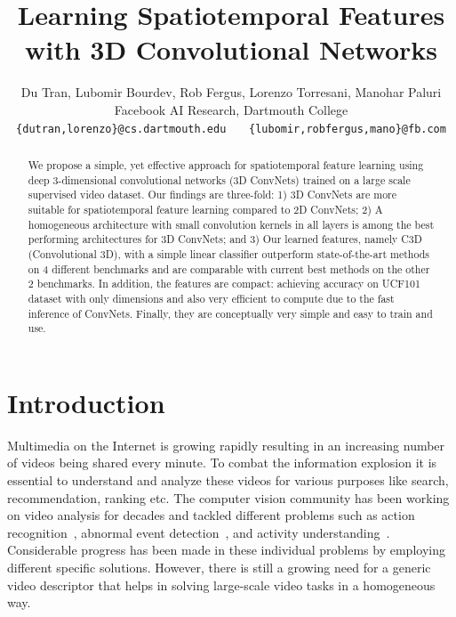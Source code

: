 \documentclass[10pt,twocolumn,letterpaper]{article}
\begin{document}
\title{Learning Spatiotemporal Features with 3D Convolutional Networks}


\author{Du Tran, Lubomir Bourdev, Rob Fergus, Lorenzo Torresani, Manohar Paluri\\
Facebook AI Research, Dartmouth College\\
{\tt\small \{dutran,lorenzo\}@cs.dartmouth.edu} \ \ \ {\tt\small \{lubomir,robfergus,mano\}@fb.com}
}


\maketitle


\vspace{-12pt}
\begin{abstract}

We propose a simple, yet effective approach for spatiotemporal feature learning using deep 3-dimensional convolutional networks (3D ConvNets) trained on a large scale supervised video dataset. Our findings are three-fold: 1) 3D ConvNets are more suitable for spatiotemporal feature learning compared to 2D ConvNets; 2) A homogeneous architecture with small  convolution kernels in all layers is among the best performing architectures for 3D ConvNets; and 3) Our learned features, namely C3D (Convolutional 3D), with a simple linear classifier outperform state-of-the-art methods on 4 different benchmarks and are comparable with current best methods on the other 2 benchmarks. In addition, the features are compact: achieving  accuracy on UCF101 dataset with only  dimensions and also very efficient to compute due to the fast inference of ConvNets. Finally, they are conceptually very simple and easy to train and use.

\end{abstract}
 
\vspace{-12pt}
\section{Introduction}
\label{sec:intro}

Multimedia on the Internet is growing rapidly resulting in an increasing number of videos being shared every minute. To combat the information explosion it is essential to understand and analyze these videos for various purposes like search, recommendation, ranking etc. The computer vision community has been working on video analysis for decades and tackled different problems such as action recognition~\cite{Laptev03}, abnormal event detection~\cite{Boiman07}, and activity understanding~\cite{Kitani12}. Considerable progress has been made in these individual problems by employing different specific solutions. However, there is still a growing need for a generic video descriptor that helps in solving large-scale video tasks in a homogeneous way.
\end{document}
